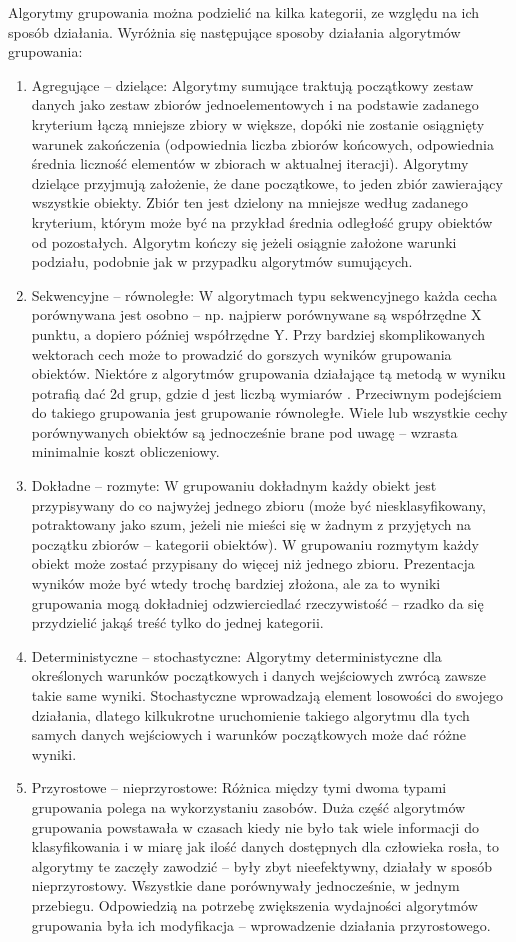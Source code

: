 \documentclass{article}
\begin{document}
Algorytmy grupowania można podzielić na kilka kategorii, ze względu na ich sposób działania. Wyróżnia się następujące sposoby działania algorytmów grupowania:

\begin{enumerate}
	\item Agregujące – dzielące: Algorytmy sumujące traktują początkowy zestaw danych jako zestaw zbiorów jednoelementowych i na podstawie zadanego kryterium łączą mniejsze zbiory w większe, dopóki nie zostanie osiągnięty warunek zakończenia (odpowiednia liczba zbiorów końcowych, odpowiednia średnia liczność elementów w zbiorach w aktualnej iteracji). Algorytmy dzielące przyjmują założenie, że dane początkowe, to jeden zbiór zawierający wszystkie obiekty. Zbiór ten jest dzielony na mniejsze według zadanego kryterium, którym może być na przykład średnia odległość grupy obiektów od pozostałych. Algorytm kończy się jeżeli osiągnie założone warunki podziału, podobnie jak w przypadku algorytmów sumujących.
	\item Sekwencyjne – równoległe: W algorytmach typu sekwencyjnego każda cecha porównywana jest osobno – np. najpierw porównywane są współrzędne X punktu, a dopiero później współrzędne Y. Przy bardziej skomplikowanych wektorach cech może to prowadzić do gorszych wyników grupowania obiektów. Niektóre z algorytmów grupowania działające tą metodą w wyniku potrafią dać 2d grup, gdzie d jest liczbą wymiarów . Przeciwnym podejściem do takiego grupowania jest grupowanie równoległe. Wiele lub wszystkie cechy porównywanych obiektów są jednocześnie brane pod uwagę – wzrasta minimalnie koszt obliczeniowy.
	\item Dokładne – rozmyte: W grupowaniu dokładnym każdy obiekt jest przypisywany  do co najwyżej jednego zbioru (może być niesklasyfikowany, potraktowany jako szum, jeżeli nie mieści się w żadnym z przyjętych na początku zbiorów – kategorii obiektów). W grupowaniu rozmytym każdy obiekt może zostać przypisany do więcej niż jednego zbioru. Prezentacja wyników może być wtedy trochę bardziej złożona, ale za to wyniki grupowania mogą dokładniej odzwierciedlać rzeczywistość – rzadko da się przydzielić jakąś treść tylko do jednej kategorii.
	\item Deterministyczne – stochastyczne: Algorytmy deterministyczne dla określonych warunków początkowych i danych wejściowych zwrócą zawsze takie same wyniki. Stochastyczne wprowadzają element losowości do swojego działania, dlatego kilkukrotne uruchomienie takiego algorytmu dla tych samych danych wejściowych i warunków początkowych może dać różne wyniki.
	\item Przyrostowe – nieprzyrostowe: Różnica między tymi dwoma typami grupowania polega na wykorzystaniu zasobów. Duża część algorytmów grupowania powstawała w czasach kiedy nie było tak wiele informacji do klasyfikowania i w miarę jak ilość danych dostępnych dla człowieka rosła, to algorytmy te zaczęły zawodzić – były zbyt nieefektywny, działały w sposób nieprzyrostowy. Wszystkie dane porównywały jednocześnie, w jednym przebiegu. Odpowiedzią na potrzebę zwiększenia wydajności algorytmów grupowania była ich modyfikacja – wprowadzenie działania przyrostowego.
\end{enumerate}
\end{document}

